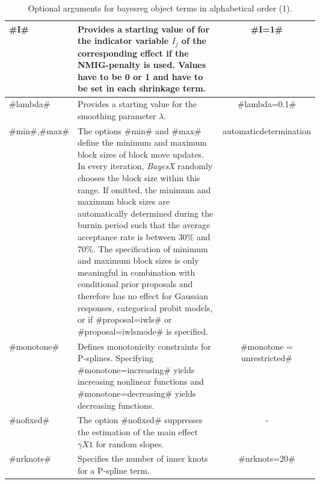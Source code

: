\begin{table}[ht]
\begin{tabular}{|l|p{0.6\linewidth}|c|}
#I#
& Provides a starting value of for the indicator variable $I_{j} $ of the corresponding
  effect if the NMIG-penalty is used. Values have to be 0 or 1 and have to be set in each shrinkage term.
& #I=1# \\
\hline


#lambda#
& Provides a starting value for the smoothing parameter $\lambda$. & #lambda=0.1# \\
\hline


#min#,#max# & The options #min# and #max# define the minimum and
maximum block sizes of block move updates. In every iteration,
{\em BayesX} randomly chooses the block size within this range. If
omitted, the minimum and maximum block sizes are automatically
determined during the burnin period such that the average
acceptance rate is between 30\% and 70\%. The specification of
minimum and maximum block sizes is only meaningful in combination
with conditional prior proposals and therefore has no effect for
Gaussian responses, categorical probit models,
 or if #proposal=iwls# or #proposal=iwlsmode# is specified. & automatic\newline determination \\
\hline

#monotone# & Defines monotonicity constraints for P-splines. Specifying #monotone=increasing# yields
increasing nonlinear functions and #monotone=decreasing# yields decreasing functions. &
#monotone = unrestricted# \\ \hline
#nofixed# & The option #nofixed# suppresses the estimation of the
main effect $\gamma X1$ for random slopes. & - \\
\hline


#nrknots# & Specifies the number of inner knots for a P-spline
term. & #nrknots=20# \\ \hline



\end{tabular}
{\em\caption{\label{options1} Optional arguments for bayesreg
object terms in alphabetical order (1).}}
\end{table}



